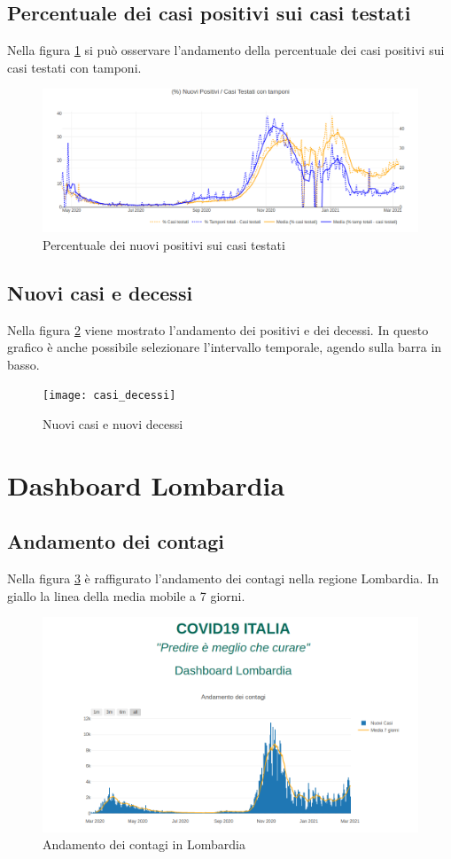 \subsection{Percentuale dei casi positivi sui casi testati}
Nella figura \ref{fig:casi_pos_testati_italy} si può osservare l'andamento della percentuale dei casi positivi sui casi testati con tamponi.
\begin{figure}[htp]
    \centering
    \includegraphics[width=14cm]{img/positivi_testati.png}
    \caption{Percentuale dei nuovi positivi sui casi testati}
    \label{fig:casi_pos_testati_italy}
\end{figure}

\subsection{Nuovi casi e decessi}
Nella figura \ref{fig:casi_decessi} viene mostrato l'andamento dei positivi e dei decessi.
In questo grafico è anche possibile selezionare l'intervallo temporale, agendo sulla barra in basso.
\begin{figure}[htp]
    \centering
    \texttt{[image: casi\_decessi]}
    \caption{Nuovi casi e nuovi decessi}
    \label{fig:casi_decessi}
\end{figure}

\section{Dashboard Lombardia}
\subsection{Andamento dei contagi}
Nella figura \ref{fig:andamento_lomb} è raffigurato l'andamento dei contagi nella regione Lombardia.
In giallo la linea della media mobile a 7 giorni.
\begin{figure}[htp]
    \centering
    \includegraphics[width=12cm]{img/lomb/andamento_lomb.png}
    \caption{Andamento dei contagi in Lombardia}
    \label{fig:andamento_lomb}
\end{figure}

